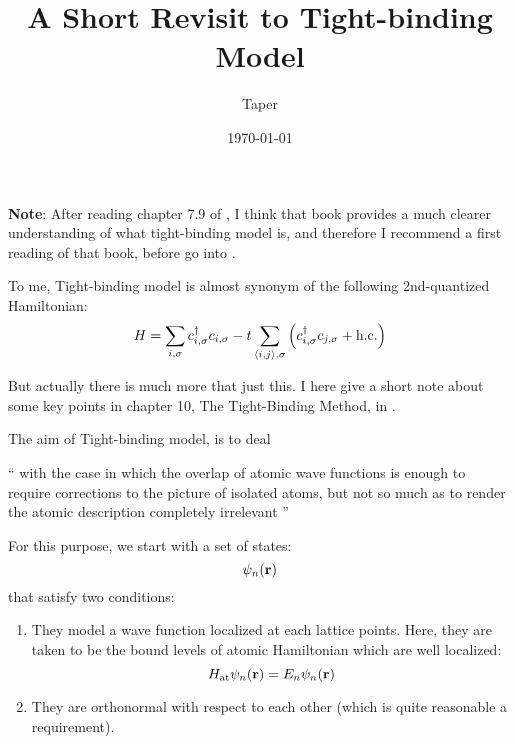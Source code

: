 \documentclass{article}
\title{A Short Revisit to Tight-binding Model}
\date{\today}
\author{Taper}
\begin{document}
\maketitle
\tableofcontents

\textbf{Note}: After reading chapter 7.9 of \cite{Parker2009}, I think
that book provides a much clearer understanding of what tight-binding
model is, and therefore I recommend a first reading of that book,
before go into \cite{Ashcroft1976}.


To me, Tight-binding model is almost synonym of the following
2nd-quantized Hamiltonian:
\begin{equation}
    H = \sum_{i,\sigma} c^\dagger_{i,\sigma} c_{i,\sigma}
    - t \sum_{\braket{i,j},\sigma} 
    \left(c^\dagger_{i,\sigma} c_{j,\sigma} + \text{h.c.}\right)
\end{equation}

But actually there is much more that just this. I here give a short
note about some key points in chapter 10, The Tight-Binding Method, in
\cite{Ashcroft1976}.

The aim of Tight-binding model, is to deal 

\begin{myquote} \enquote{
with the case in which the overlap of atomic wave functions is enough
to require corrections to the picture of isolated atoms, but not so
much as to render the atomic description completely irrelevant
} \end{myquote}

For this purpose, we start with a set of states:
\begin{equation}
    \psi_{n}(\vb{r})
\end{equation}
that satisfy two conditions:
\begin{enumerate}
    \item They model a wave function localized at each lattice points.
        Here, they are taken to be the bound levels of atomic
        Hamiltonian which are well localized:
        \begin{equation}
            H_{\text{at}} \psi_n(\vb{r})  = E_n \psi_n(\vb{r})
        \end{equation}
    \item They are orthonormal with respect to each other (which is
        quite reasonable a requirement).
\end{enumerate}
\end{document}
